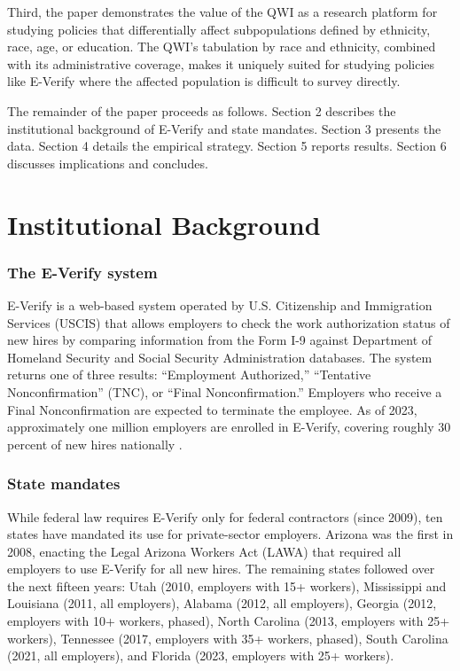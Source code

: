 \documentclass[12pt]{article}
\begin{document}
Third, the paper demonstrates the value of the QWI as a research platform for studying policies that differentially affect subpopulations defined by ethnicity, race, age, or education. The QWI's tabulation by race and ethnicity, combined with its administrative coverage, makes it uniquely suited for studying policies like E-Verify where the affected population is difficult to survey directly.

The remainder of the paper proceeds as follows. Section 2 describes the institutional background of E-Verify and state mandates. Section 3 presents the data. Section 4 details the empirical strategy. Section 5 reports results. Section 6 discusses implications and concludes.


\section{Institutional Background}

\subsubsection*{The E-Verify system} E-Verify is a web-based system operated by U.S. Citizenship and Immigration Services (USCIS) that allows employers to check the work authorization status of new hires by comparing information from the Form I-9 against Department of Homeland Security and Social Security Administration databases. The system returns one of three results: ``Employment Authorized,'' ``Tentative Nonconfirmation'' (TNC), or ``Final Nonconfirmation.'' Employers who receive a Final Nonconfirmation are expected to terminate the employee. As of 2023, approximately one million employers are enrolled in E-Verify, covering roughly 30 percent of new hires nationally \citep{uscis2023everify}.

\subsubsection*{State mandates} While federal law requires E-Verify only for federal contractors (since 2009), ten states have mandated its use for private-sector employers. Arizona was the first in 2008, enacting the Legal Arizona Workers Act (LAWA) that required all employers to use E-Verify for all new hires. The remaining states followed over the next fifteen years: Utah (2010, employers with 15+ workers), Mississippi and Louisiana (2011, all employers), Alabama (2012, all employers), Georgia (2012, employers with 10+ workers, phased), North Carolina (2013, employers with 25+ workers), Tennessee (2017, employers with 35+ workers, phased), South Carolina (2021, all employers), and Florida (2023, employers with 25+ workers).
\end{document}
